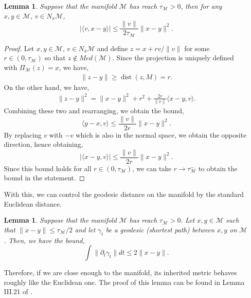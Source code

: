\documentclass[10pt]{article}
\theoremstyle{plain}
\newtheorem{lemma}[theorem]{Lemma}
\theoremstyle{definition}
\theoremstyle{remark}
\newcommand{\M}{{\mathcal{M}}}
\newcommand{\dist}{\operatorname{dist}}
\begin{document}
\begin{lemma}\label{lem:reach_angle}
Suppose that the manifold \(\M\) has reach \(\tau_\M > 0\), then for any \(x, y \in \M\), \(v \in N_x \M\),
\begin{equation*}
    |\langle v, x - y \rangle | \leq \frac{\|v\|}{2\tau_\M} \|x - y\|^2.
\end{equation*}
\end{lemma}
\begin{proof}
Let \(x, y \in \M\), \(v \in N_x \M\) and define \(z = x + r v/\|v\|\) for some \(r \in (0, \tau_\M)\) so that \(z \not \in Med(\M)\). Since the projection is uniquely defined with \(\Pi_\M(z) = x\), we have, 
\begin{align*}
    \|z - y\| \geq \dist(z, M) = r.
\end{align*}
On the other hand, we have,
\begin{align*}
    \|z - y\|^2 = \|x - y\|^2 + r^2 + \frac{2 r}{\|v\|} \langle x - y, v \rangle.
\end{align*}
Combining these two and rearranging, we obtain the bound,
\begin{equation*}
    \langle y - x, v \rangle \leq \frac{\|v\|}{2r} \|x-y\|^2.
\end{equation*}
By replacing \(v\) with \(-v\) which is also in the normal space, we obtain the opposite direction, hence obtaining,
\begin{equation*}
    |\langle x - y, v \rangle| \leq \frac{\|v\|}{2r} \|x-y\|^2.
\end{equation*}
Since this bound holds for all \(r \in (0, \tau_\M)\), we can take \(r \to \tau_\M^-\) to obtain the bound in the statement.
\end{proof}

With this, we can control the geodesic distance on the manifold by the standard Euclidean distance.
\begin{lemma}\label{lem:geo_to_euc}
Suppose that the manifold \(\M\) has reach \(\tau_\M > 0\). Let \(x, y \in \M\) such that \(\|x - y\| \leq \tau_\M/2\) and let \(\gamma_t\) be a geodesic (shortest path) between \(x, y\) on \(\M\). Then, we have the bound,
\begin{equation*}
    \int \|\partial_t \gamma_t\| dt \leq 2 \|x - y\|.
\end{equation*}
\end{lemma}
Therefore, if we are close enough to the manifold, its inherited metric behaves roughly like the Euclidean one. The proof of this lemma can be found in Lemma III.21 of \citep{Aamari2017-he}.
\end{document}
